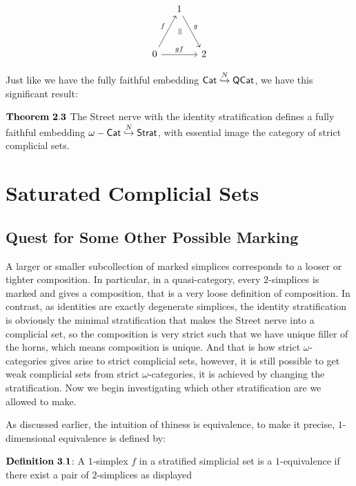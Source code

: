 \documentclass[11pt]{article}
\newcommand{\veq}{\rotatebox[origin=c]{-90}{$=$}}
\begin{document}
\begin{equation*}
\begin{tikzcd}[column sep=small, row sep=small]
& 1 \arrow{rdd}{g} \\
& \veq \\
0 \arrow{uur}{f} \arrow{rr}{gf} &  & 2
\end{tikzcd}
\end{equation*}


Just like we have the fully faithful embedding ${\sf Cat}\overset{N}\hookrightarrow{\sf QCat}$, we have this significant result:

$\bf Theorem \ 2.3$ The Street nerve with the identity stratification defines a fully faithful embedding $\omega-{\sf Cat}\overset{N}\hookrightarrow{\sf Strat}$, with essential image the category of strict complicial sets.

\section{Saturated Complicial Sets}

\subsection{Quest for Some Other Possible Marking}

A larger or smaller subcollection of marked simplices corresponds to a looser or tighter composition. In particular, in a quasi-category, every $2$-simplices is marked and gives a composition, that is a very loose definition of composition. In contrast, as identities are exactly degenerate simplices, the identity stratification is obviously the minimal stratification that makes the Street nerve into a complicial set, so the composition is very strict such that we have unique filler of the horns, which means composition is unique. And that is how strict $\omega$-categories gives arise to strict complicial sets, however, it is still possible to get weak complicial sets from strict $\omega$-categories, it is achieved by changing the stratification. Now we begin investigating which other stratification are we allowed to make.

As discussed earlier, the intuition of thiness is equivalence, to make it precise, $1$-dimensional equivalence is defined by:

$\bf Definition \ 3.1$: A $1$-simplex $f$ in a stratified simplicial set is a $1$-equivalence if there exist a pair of $2$-simplices as displayed
\end{document}
